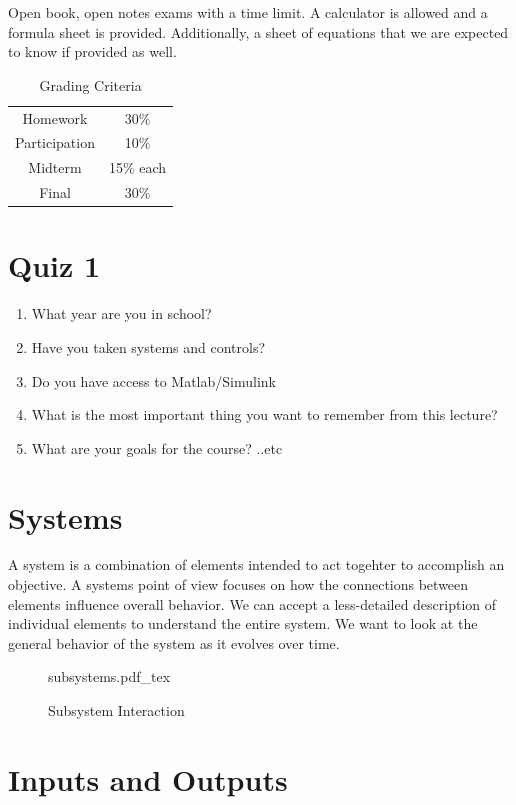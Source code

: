 \documentclass[12pt, a4paper]{report}
\newcommand{\incfig}[2][1]{%
    \def\svgwidth{#1\columnwidth}
    {#2.pdf_tex}
}
\begin{document}
  Open book, open notes exams with a time limit. A calculator is allowed and a formula sheet is provided. Additionally, a sheet of equations that we are expected to know if provided as well.

  \begin{table}
    \centering
    \caption{Grading Criteria}
    \label{tab:table1}
    \begin{tabular}{c c}
      Homework & 30\% \\
      Participation & 10\% \\
      Midterm & 15\% each \\
      Final & 30\%
    \end{tabular}
  \end{table}

  \section{Quiz 1}

  \begin{enumerate}
    \item What year are you in school?
    \item Have you taken systems and controls?
    \item Do you have access to Matlab/Simulink
    \item What is the most important thing you want to remember from this lecture?
    \item What are your goals for the course? ..etc
  \end{enumerate}

  \section{Systems}

  A system is a combination of elements intended to act togehter to accomplish an objective. A systems point of view focuses on how the connections between elements influence overall behavior. We can accept a less-detailed description of individual elements to understand the entire system. We want to look at the general behavior of the system as it evolves over time.

  \begin{figure}
    \centering
    \incfig{subsystems}
    \caption{Subsystem Interaction}
  \end{figure}

  \newpage
  \section{Inputs and Outputs}
\end{document}

